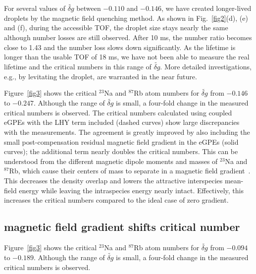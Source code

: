 For several values of $\widetilde{\delta g}$ between $-0.110$ and $-0.146$, we have created longer-lived droplets by the magnetic field quenching method. As shown in Fig.~\ref{fig2}(d), (e) and (f), during the accessible TOF, the droplet size stays nearly the same although number losses are still observed. After 10 ms, the number ratio becomes close to 1.43 and the number loss slows down significantly. As the lifetime is longer than the usable TOF 
of 18 ms, we have not been able to measure the real lifetime and the critical numbers in this range of $\widetilde{\delta g}$. More detailed investigations, e.g., by levitating the droplet, are warranted in the near future.




Figure~\ref{fig3} shows the critical $^{23}$Na and $^{87}$Rb atom numbers for $\widetilde{\delta g}$ from $-0.146$ to $-0.247$.
Although the range of $\widetilde{\delta g}$ is small, a four-fold change in the measured critical numbers is observed. 
The critical numbers calculated using coupled eGPEs with the LHY term included (dashed curves) show large discrepancies with the measurements. The agreement is greatly improved by also including the small post-compensation residual magnetic field gradient in the eGPEs (solid curves); the additional term nearly doubles  the critical numbers. This can be understood from the different magnetic dipole moments and masses of $^{23}$Na and $^{87}$Rb, which cause their centers of mass to separate in a magnetic field gradient~\cite{SM}. This decreases the density overlap and lowers the attractive interspecies mean-field energy while leaving the intraspecies energy nearly intact. Effectively, this increases the critical numbers compared to the ideal case of zero gradient.

\subsection{magnetic field gradient shifts critical number}
Figure~\ref{fig3} shows the critical $^{23}$Na and $^{87}$Rb atom numbers for $\widetilde{\delta g}$ from $-0.094$ to $-0.189$.
Although the range of $\widetilde{\delta g}$ is small, a four-fold change in the measured critical numbers is observed. 


